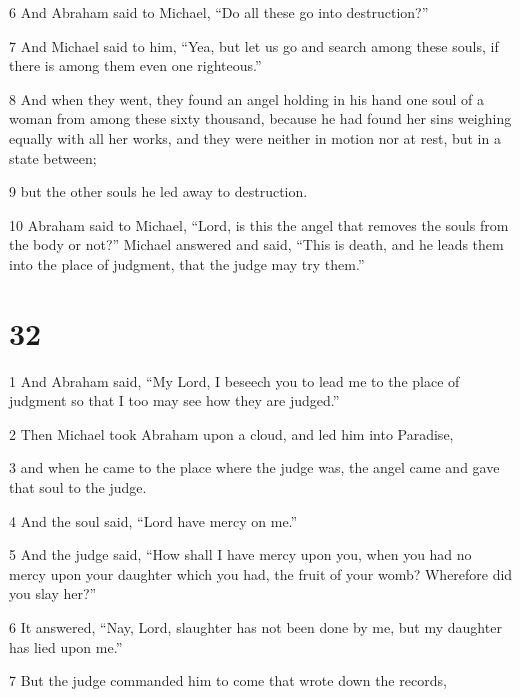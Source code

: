 \par 6 And Abraham said to Michael, “Do all these go into destruction?” 

\par 7 And Michael said to him, “Yea, but let us go and search among these souls, if there is among them even one righteous.” 

\par 8 And when they went, they found an angel holding in his hand one soul of a woman from among these sixty thousand, because he had found her sins weighing equally with all her works, and they were neither in motion nor at rest, but in a state between; 

\par 9 but the other souls he led away to destruction. 

\par 10 Abraham said to Michael, “Lord, is this the angel that removes the souls from the body or not?” Michael answered and said, “This is death, and he leads them into the place of judgment, that the judge may try them.”

\chapter{32}

\par 1 And Abraham said, “My Lord, I beseech you to lead me to the place of judgment so that I too may see how they are judged.” 

\par 2 Then Michael took Abraham upon a cloud, and led him into Paradise, 

\par 3 and when he came to the place where the judge was, the angel came and gave that soul to the judge. 

\par 4 And the soul said, “Lord have mercy on me.” 

\par 5 And the judge said, “How shall I have mercy upon you, when you had no mercy upon your daughter which you had, the fruit of your womb? Wherefore did you slay her?” 

\par 6 It answered, “Nay, Lord, slaughter has not been done by me, but my daughter has lied upon me.” 

\par 7 But the judge commanded him to come that wrote down the records, 

